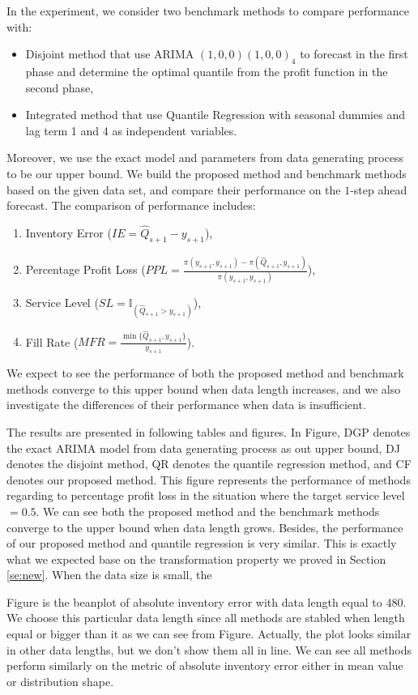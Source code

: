\documentclass{article}
\begin{document}
In the experiment, we consider two benchmark methods to compare performance with:
\begin{itemize}
    \item Disjoint method that use ARIMA $(1,0,0)(1,0,0)_4$ to forecast in the first phase and determine the optimal quantile from the profit function in the second phase,
    \item Integrated method that use Quantile Regression with seasonal dummies and lag term 1 and 4 as independent variables.
\end{itemize}
Moreover, we use the exact model and parameters from data generating process to be our upper bound. We build the proposed method and benchmark methods based on the given data set, and compare their performance on the $1$-step ahead forecast. The comparison of performance includes:
\begin{enumerate}
    \item Inventory Error  ($IE=\hat{Q}_{s+1}-y_{s+1}$),
    \item Percentage Profit Loss ($PPL=\frac{\pi(y_{s+1},y_{s+1})-\pi(\hat{Q}_{s+1},y_{s+1})}{\pi(y_{s+1},y_{s+1})}$),
    \item Service Level ($SL=\mathbb {I}_{(\hat{Q}_{s+1}>y_{s+1})}$),
    \item Fill Rate ($MFR=\frac{\min\{\hat{Q}_{s+1},y_{s+1}\}}{y_{s+1}}$).
\end{enumerate}
We expect to see the performance of both the proposed method and benchmark methods converge to this upper bound when data length increases, and we also investigate the differences of their performance when data is insufficient.

The results are presented in following tables and figures. In Figure, DGP denotes the exact ARIMA model from data generating process as out upper bound, DJ denotes the disjoint method, QR denotes the quantile regression method, and CF denotes our proposed method. This figure represents the performance of methods regarding to percentage profit loss in the situation where the target service level $=0.5$. We can see both the proposed method and the benchmark methods converge to the upper bound when data length grows. Besides, the performance of our proposed method and quantile regression is very similar. This is exactly what we expected base on the transformation property we proved in Section \ref{se:new}. When the data size is small, the  



Figure is the beanplot of absolute inventory error with data length equal to 480. We choose this particular data length since all methods are stabled when length equal or bigger than it as we can see from Figure. Actually, the plot looks similar in other data lengths, but we don't show them all in line. We can see all methods perform similarly on the metric of absolute inventory error either in mean value or distribution shape. 
\end{document}
